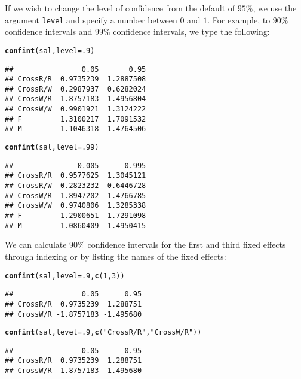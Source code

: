 \documentclass[11pt]{article}\usepackage[]{graphicx}\usepackage[]{color}
\makeatletter
\newcommand{\hlnum}[1]{\textcolor[rgb]{0.686,0.059,0.569}{#1}}%
\newcommand{\hlstr}[1]{\textcolor[rgb]{0.192,0.494,0.8}{#1}}%
\newcommand{\hlstd}[1]{\textcolor[rgb]{0.345,0.345,0.345}{#1}}%
\newcommand{\hlkwc}[1]{\textcolor[rgb]{0.333,0.667,0.333}{#1}}%
\newcommand{\hlkwd}[1]{\textcolor[rgb]{0.737,0.353,0.396}{\textbf{#1}}}%
\newenvironment{kframe}{%
 \def\at@end@of@kframe{}%
 \ifinner\ifhmode%
  \def\at@end@of@kframe{\end{minipage}}%
  \begin{minipage}{\columnwidth}%
 \fi\fi%
 \def\FrameCommand##1{\hskip\@totalleftmargin \hskip-\fboxsep
 \colorbox{shadecolor}{##1}\hskip-\fboxsep
     \hskip-\linewidth \hskip-\@totalleftmargin \hskip\columnwidth}%
 \MakeFramed {\advance\hsize-\width
   \@totalleftmargin\z@ \linewidth\hsize
   \@setminipage}}%
 {\par\unskip\endMakeFramed%
 \at@end@of@kframe}
\newenvironment{knitrout}{}{} %
\makeatother
\begin{document}
If we wish to change the level of confidence from the default of $95\%$, we use the argument \texttt{level} and specify a number between $0$ and $1$. For example, to $90\%$ confidence intervals and $99\%$ confidence intervals, we type the following:
\begin{knitrout}
\color{fgcolor}\begin{kframe}
\begin{alltt}
\hlkwd{confint}\hlstd{(sal,}\hlkwc{level}\hlstd{=}\hlnum{.9}\hlstd{)}
\end{alltt}
\begin{verbatim}
##                0.05       0.95
## CrossR/R  0.9735239  1.2887508
## CrossR/W  0.2987937  0.6282024
## CrossW/R -1.8757183 -1.4956804
## CrossW/W  0.9901921  1.3124222
## F         1.3100217  1.7091532
## M         1.1046318  1.4764506
\end{verbatim}
\begin{alltt}
\hlkwd{confint}\hlstd{(sal,}\hlkwc{level}\hlstd{=}\hlnum{.99}\hlstd{)}
\end{alltt}
\begin{verbatim}
##               0.005      0.995
## CrossR/R  0.9577625  1.3045121
## CrossR/W  0.2823232  0.6446728
## CrossW/R -1.8947202 -1.4766785
## CrossW/W  0.9740806  1.3285338
## F         1.2900651  1.7291098
## M         1.0860409  1.4950415
\end{verbatim}
\end{kframe}
\end{knitrout}

We can calculate $90\%$ confidence intervals for the first and third fixed effects through indexing or by listing the names of the fixed effects:
\begin{knitrout}
\color{fgcolor}\begin{kframe}
\begin{alltt}
\hlkwd{confint}\hlstd{(sal,}\hlkwc{level}\hlstd{=}\hlnum{.9}\hlstd{,}\hlkwd{c}\hlstd{(}\hlnum{1}\hlstd{,}\hlnum{3}\hlstd{))}
\end{alltt}
\begin{verbatim}
##                0.05      0.95
## CrossR/R  0.9735239  1.288751
## CrossW/R -1.8757183 -1.495680
\end{verbatim}
\begin{alltt}
\hlkwd{confint}\hlstd{(sal,}\hlkwc{level}\hlstd{=}\hlnum{.9}\hlstd{,}\hlkwd{c}\hlstd{(}\hlstr{"CrossR/R"}\hlstd{,}\hlstr{"CrossW/R"}\hlstd{))}
\end{alltt}
\begin{verbatim}
##                0.05      0.95
## CrossR/R  0.9735239  1.288751
## CrossW/R -1.8757183 -1.495680
\end{verbatim}
\end{kframe}
\end{knitrout}
\end{document}
